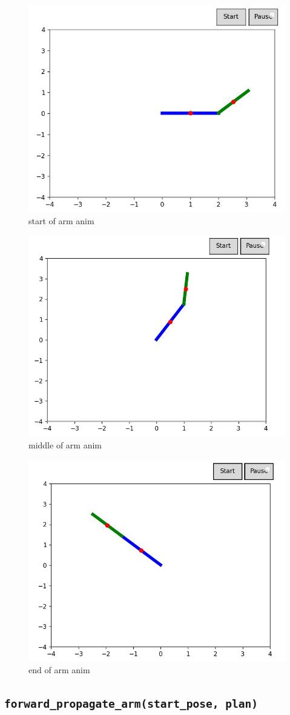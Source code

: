 \documentclass{article}
\begin{document}
\begin{figure} [H]
    \centering
    \includegraphics[width=0.5\linewidth]{latex_media/start of arm anim.jpg}
    \caption{start of arm anim}
    \label{fig:9}
\end{figure}

\begin{figure} [H]
    \centering
    \includegraphics[width=0.5\linewidth]{latex_media/middle of arm anim.jpg}
    \caption{middle of arm anim}
    \label{fig:10}
\end{figure}

\begin{figure} [H]
    \centering
    \includegraphics[width=0.5\linewidth]{latex_media/end of arm anim.jpg}
    \caption{end of arm anim}
    \label{fig:11}
\end{figure}

\subsection{\texttt{forward\_propagate\_arm(start\_pose, plan)}}
\end{document}
